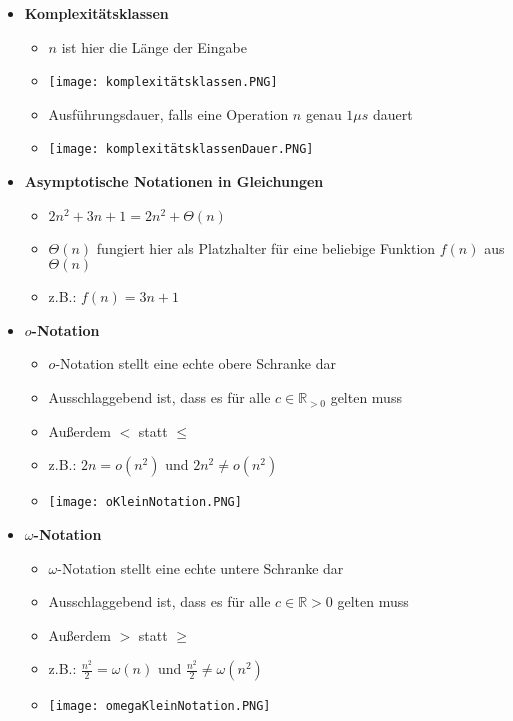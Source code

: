 \begin{itemize}
        \item \textbf{Komplexitätsklassen}
            \begin{itemize}
                \item $n$ ist hier die Länge der Eingabe
                \item[] \texttt{[image: komplexitätsklassen.PNG]}
                \item Ausführungsdauer, falls eine Operation $n$ genau $1\mu s$ dauert 
                \item[] \texttt{[image: komplexitätsklassenDauer.PNG]}
            \end{itemize}
        
\pagebreak

        \item \textbf{Asymptotische Notationen in Gleichungen}
            \begin{itemize}
                \item $2n^2 + 3n + 1 = 2n^2 + \Theta(n)$
                \item $\Theta(n)$ fungiert hier als Platzhalter für eine beliebige Funktion $f(n)$ aus $\Theta(n)$
                \item z.B.: $f(n) = 3n + 1$
            \end{itemize}
        
        \item \textbf{$o$-Notation}
            \begin{itemize}
                \item $o$-Notation stellt eine echte obere Schranke dar
                \item Ausschlaggebend ist, dass es für alle $c \in \mathbb{R}_{>0}$ gelten muss
                \item Au\ss erdem $<$ statt $\leq$
                \item z.B.: $2n = o(n^2)$ und $2n^2 \neq o(n^2)$ 
                \item[] \texttt{[image: oKleinNotation.PNG]}
                
            \end{itemize}
        
        \item \textbf{$\omega$-Notation}
            \begin{itemize}
                \item $\omega$-Notation stellt eine echte untere Schranke dar
                \item Ausschlaggebend ist, dass es für alle $c \in \mathbb{R}{>0}$ gelten muss
                \item Au\ss erdem $>$ statt $\geq$
                \item z.B.: $\frac{n^2}{2} = \omega(n)$ und $\frac{n^2}{2} \neq \omega(n^2)$
                \item[] \texttt{[image: omegaKleinNotation.PNG]}
            \end{itemize}
    \end{itemize}

